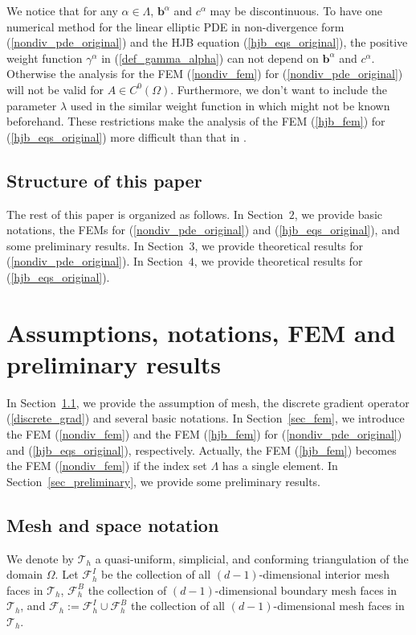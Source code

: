 \documentclass[12pt]{amsart}
\theoremstyle{definition}
\theoremstyle{remark}
\begin{document}
We notice that for any $\alpha \in \Lambda$, $\boldsymbol{b}^{\alpha}$ and $c^{\alpha}$ may be discontinuous. 
To have one numerical method for the linear elliptic PDE in non-divergence form (\ref{nondiv_pde_original}) and 
the HJB equation (\ref{hjb_eqs_original}), the positive weight function $\gamma^{\alpha}$ in (\ref{def_gamma_alpha}) 
can not depend on $\boldsymbol{b}^{\alpha}$ and $c^{\alpha}$. Otherwise the analysis for the FEM (\ref{nondiv_fem}) 
for (\ref{nondiv_pde_original}) will not be valid for $A\in C^{0}(\Omega)$. Furthermore, we don't want to include 
the parameter $\lambda$ used in the similar weight function in \cite{SmearsSuli2014} which might not be known 
beforehand. These restrictions make the analysis 
of the FEM (\ref{hjb_fem}) for (\ref{hjb_eqs_original}) more difficult than that in \cite{SmearsSuli2014}.

\subsection{Structure of this paper}
The rest of this paper is organized as follows. In Section~$2$, we provide basic notations, the FEMs
for (\ref{nondiv_pde_original}) and (\ref{hjb_eqs_original}), and some preliminary results. In 
Section~$3$, we provide theoretical results for (\ref{nondiv_pde_original}). In Section~$4$, we provide 
theoretical results for (\ref{hjb_eqs_original}).

\section{Assumptions, notations, FEM and preliminary results}

In Section~\ref{sec_notation}, we provide the assumption of mesh, the discrete gradient operator (\ref{discrete_grad}) 
and several basic notations. In Section~\ref{sec_fem}, we introduce the FEM (\ref{nondiv_fem}) and the FEM  
(\ref{hjb_fem}) for (\ref{nondiv_pde_original}) and (\ref{hjb_eqs_original}), respectively. Actually, 
the FEM (\ref{hjb_fem}) becomes the FEM (\ref{nondiv_fem}) if the index set $\Lambda$ has a single element. 
In Section~\ref{sec_preliminary}, we provide some preliminary results. 

\subsection{Mesh and space notation}
\label{sec_notation}
We denote by $\mathcal{T}_{h}$ a quasi-uniform, simplicial, and conforming triangulation of the domain $\Omega$.
Let $\mathcal{F}_{h}^{I}$ be the collection of all $(d-1)$-dimensional interior mesh faces in $\mathcal{T}_{h}$, 
$\mathcal{F}_{h}^{B}$ the collection of $(d-1)$-dimensional boundary mesh faces in $\mathcal{T}_{h}$, and 
$\mathcal{F}_{h}:=\mathcal{F}_{h}^{I} \cup \mathcal{F}_{h}^{B}$ 
the collection of all $(d-1)$-dimensional mesh faces in $\mathcal{T}_{h}$.
\end{document}
